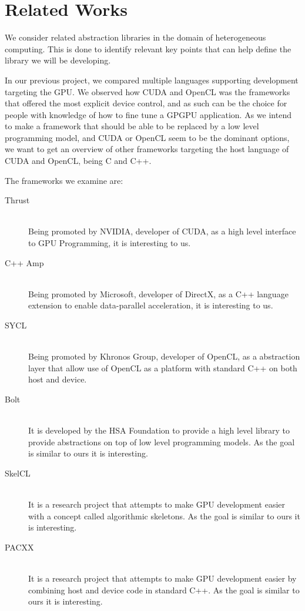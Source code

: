 \section{Related Works}
We consider related abstraction libraries in the domain of heterogeneous computing. This is done to identify relevant key points that can help define the library we will be developing.

In our previous project, we compared multiple languages supporting development targeting the GPU\cite{sw9Report}. We observed how CUDA and OpenCL was the frameworks that offered the most explicit device control, and as such can be the choice for people with knowledge of how to fine tune a GPGPU application. As we intend to make a framework that should be able to be replaced by a low level programming model, and CUDA or OpenCL seem to be the dominant options, we want to get an overview of other frameworks targeting the host language of CUDA and OpenCL, being C and C++.

The frameworks we examine are:
\begin{description}
\item[Thrust] \hfill \\
Being promoted by NVIDIA, developer of CUDA, as a high level interface to GPU Programming, it is interesting to us\cite{thrustNvidia}.
\item[C++ Amp] \hfill \\
Being promoted by Microsoft, developer of DirectX, as a C++ language extension to enable data-parallel acceleration, it is interesting to us\cite{microsoftCppAMP}.
\item[SYCL] \hfill \\
Being promoted by Khronos Group, developer of OpenCL, as a abstraction layer that allow use of OpenCL as a platform with standard C++ on both host and device\cite{khronosSYCL}.
\item[Bolt] \hfill \\
It is developed by the HSA Foundation to provide a high level library to provide abstractions on top of low level programming models. As the goal is similar to ours it is interesting\cite{boltDoc}.
\item[SkelCL] \hfill \\
It is a research project that attempts to make GPU development easier with a concept called algorithmic skeletons. As the goal is similar to ours it is interesting\cite{skelclPaper}.
\item[PACXX] \hfill \\
It is a research project that attempts to make GPU development easier by combining host and device code in standard C++. As the goal is similar to ours it is interesting\cite{pacxxPaper}.
\end{description}

